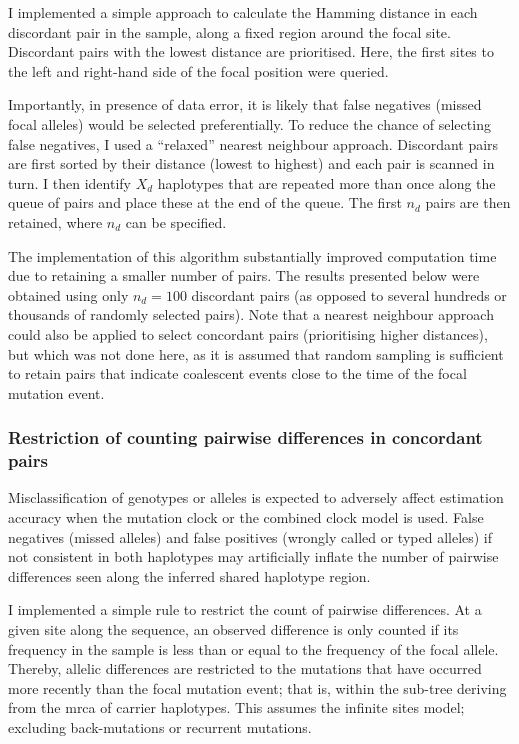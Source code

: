 I implemented a simple approach to calculate the Hamming distance in each discordant pair in the sample, along a fixed region around the focal site.
Discordant pairs with the lowest distance are prioritised.
Here, the first  sites to the left and right-hand side of the focal position were queried.

Importantly, in presence of data error, it is likely that false negatives (missed focal alleles) would be selected preferentially.
To reduce the chance of selecting false negatives, I used a ``relaxed'' nearest neighbour approach.
Discordant pairs are first sorted by their distance (lowest to highest) and each pair is scanned in turn.
I then identify $X_d$ haplotypes that are repeated more than once along the queue of pairs and place these at the end of the queue.
The first $n_d$ pairs are then retained, where $n_d$ can be specified.

The implementation of this algorithm substantially improved computation time due to retaining a smaller number of pairs.
The results presented below were obtained using only $n_d=100$ discordant pairs (as opposed to several hundreds or thousands of randomly selected pairs).
Note that a nearest neighbour approach could also be applied to select concordant pairs (prioritising higher distances), but which was not done here, as it is assumed that random sampling is sufficient to retain pairs that indicate coalescent events close to the time of the focal mutation event.




%
\subsubsection{Restriction of counting pairwise differences in concordant pairs}
%

Misclassification of genotypes or alleles is expected to adversely affect estimation accuracy when the mutation clock or the combined clock model is used.
False negatives (missed alleles) and false positives (wrongly called or typed alleles) if not consistent in both haplotypes may artificially inflate the number of pairwise differences seen along the inferred shared haplotype region.

I implemented a simple rule to restrict the count of pairwise differences.
At a given site along the sequence, an observed difference is only counted if its frequency in the sample is less than or equal to the frequency of the focal allele.
Thereby, allelic differences are restricted to the mutations that have occurred more recently than the focal mutation event; that is, within the sub-tree deriving from the \gls{mrca} of carrier haplotypes.
This assumes the infinite sites model; \ie excluding back-mutations or recurrent mutations.

